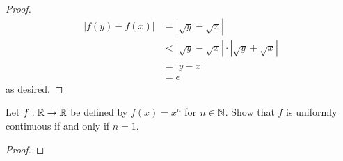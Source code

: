 \documentclass[../main.tex]{subfiles}
\begin{document}
\begin{exercise}
\begin{enumerate}[label={(\alph*)}]
\begin{proof}
            \begin{align*}
                |f(y)-f(x)| &= |\sqrt{y}-\sqrt{x}|\\
                &< |\sqrt{y}-\sqrt{x}|\cdot|\sqrt{y}+\sqrt{x}|\\
                &= |y-x|\\
                &= \epsilon
            \end{align*}
            as desired.
        \end{proof}
    \end{enumerate}
\end{exercise}

\begin{exercise}\label{exr:13.4}
    Let $f:\mathbb{R}\to\mathbb{R}$ be defined by $f(x)=x^n$ for $n\in\mathbb{N}$. Show that $f$ is uniformly continuous if and only if $n=1$.
    \begin{proof}

\end{proof}
\end{exercise}
\end{document}
